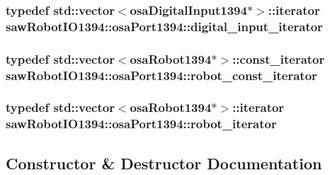 \subsubsection[{digital\+\_\+input\+\_\+iterator}]{\setlength{\rightskip}{0pt plus 5cm}typedef std\+::vector$<${\bf osa\+Digital\+Input1394}$\ast$$>$\+::iterator {\bf saw\+Robot\+I\+O1394\+::osa\+Port1394\+::digital\+\_\+input\+\_\+iterator}\hspace{0.3cm}{\ttfamily [protected]}}\label{classsaw_robot_i_o1394_1_1osa_port1394_a4915e713bba71fecf60a3a761a932485}
\hypertarget{classsaw_robot_i_o1394_1_1osa_port1394_a2cfdedd5dac44343f9b00f40aeff218c}{}
\subsubsection[{robot\+\_\+const\+\_\+iterator}]{\setlength{\rightskip}{0pt plus 5cm}typedef std\+::vector$<${\bf osa\+Robot1394}$\ast$$>$\+::const\+\_\+iterator {\bf saw\+Robot\+I\+O1394\+::osa\+Port1394\+::robot\+\_\+const\+\_\+iterator}\hspace{0.3cm}{\ttfamily [protected]}}\label{classsaw_robot_i_o1394_1_1osa_port1394_a2cfdedd5dac44343f9b00f40aeff218c}
\hypertarget{classsaw_robot_i_o1394_1_1osa_port1394_a2e6156bdb43167b1dc7d3ff98fdb1761}{}
\subsubsection[{robot\+\_\+iterator}]{\setlength{\rightskip}{0pt plus 5cm}typedef std\+::vector$<${\bf osa\+Robot1394}$\ast$$>$\+::iterator {\bf saw\+Robot\+I\+O1394\+::osa\+Port1394\+::robot\+\_\+iterator}\hspace{0.3cm}{\ttfamily [protected]}}\label{classsaw_robot_i_o1394_1_1osa_port1394_a2e6156bdb43167b1dc7d3ff98fdb1761}


\subsection{Constructor \& Destructor Documentation}
\hypertarget{classsaw_robot_i_o1394_1_1osa_port1394_a41274223831e4ba37ce3adf64994dd53}{}
